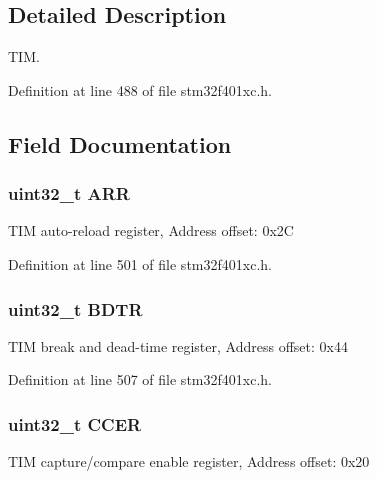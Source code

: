 \subsection{Detailed Description}
T\+IM. 

Definition at line 488 of file stm32f401xc.\+h.



\subsection{Field Documentation}
\subsubsection[{\texorpdfstring{A\+RR}{ARR}}]{ uint32\+\_\+t A\+RR}\hypertarget{struct_t_i_m___type_def_af17f19bb4aeea3cc14fa73dfa7772cb8}{}\label{struct_t_i_m___type_def_af17f19bb4aeea3cc14fa73dfa7772cb8}
T\+IM auto-\/reload register, Address offset\+: 0x2C 

Definition at line 501 of file stm32f401xc.\+h.

\subsubsection[{\texorpdfstring{B\+D\+TR}{BDTR}}]{ uint32\+\_\+t B\+D\+TR}\hypertarget{struct_t_i_m___type_def_a476bae602205d6a49c7e71e2bda28c0a}{}\label{struct_t_i_m___type_def_a476bae602205d6a49c7e71e2bda28c0a}
T\+IM break and dead-\/time register, Address offset\+: 0x44 

Definition at line 507 of file stm32f401xc.\+h.

\subsubsection[{\texorpdfstring{C\+C\+ER}{CCER}}]{ uint32\+\_\+t C\+C\+ER}\hypertarget{struct_t_i_m___type_def_a098110becfef10e1fd1b6a4f874da496}{}\label{struct_t_i_m___type_def_a098110becfef10e1fd1b6a4f874da496}
T\+IM capture/compare enable register, Address offset\+: 0x20 

